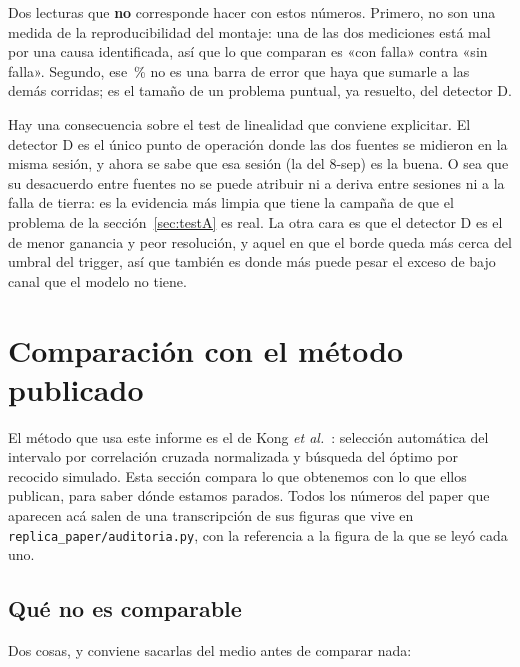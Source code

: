 \documentclass[11pt,a4paper]{article}
\begin{document}
\begin{aviso}
Dos lecturas que \textbf{no} corresponde hacer con estos números. Primero, no
son una medida de la reproducibilidad del montaje: una de las dos mediciones
está mal por una causa identificada, así que lo que comparan es «con falla»
contra «sin falla». Segundo, ese \RepMax\,\% no es una barra de error que haya
que sumarle a las demás corridas; es el tamaño de un problema puntual, ya
resuelto, del detector D.
\end{aviso}

Hay una consecuencia sobre el test de linealidad que conviene explicitar. El
detector D es el único punto de operación donde las dos fuentes se midieron en
la misma sesión, y ahora se sabe que esa sesión (la del 8-sep) es la buena. O
sea que su desacuerdo entre fuentes no se puede atribuir ni a deriva entre
sesiones ni a la falla de tierra: es la evidencia más limpia que tiene la
campaña de que el problema de la sección~\ref{sec:testA} es real. La otra cara
es que el detector D es el de menor ganancia y peor resolución, y aquel en que
el borde queda más cerca del umbral del trigger, así que también es donde más
puede pesar el exceso de bajo canal que el modelo no tiene.

\section{Comparación con el método publicado}
\label{sec:paper}

El método que usa este informe es el de Kong \emph{et al.}~\cite{kong2025}:
selección automática del intervalo por correlación cruzada
normalizada y búsqueda del óptimo por recocido simulado. Esta sección compara
lo que obtenemos con lo que ellos publican, para saber dónde estamos parados.
Todos los números del paper que aparecen acá salen de una transcripción de sus
figuras que vive en \texttt{replica\_paper/auditoria.py}, con la referencia a la
figura de la que se leyó cada uno.

\subsection{Qué no es comparable}

Dos cosas, y conviene sacarlas del medio antes de comparar nada:
\end{document}
